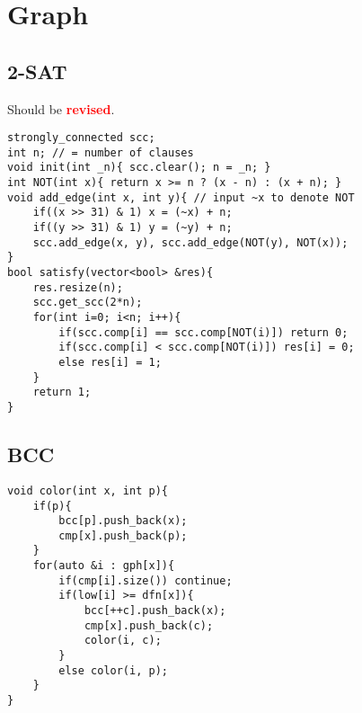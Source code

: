 \documentclass[landscape, 8pt, a4paper, oneside,  twocolumn]{extarticle}
\newcommand{\revised}{Should be \textcolor{red}{\textbf{revised}}.}
\begin{document}
\section{Graph}
\subsection {2-SAT}
\revised
\begin{verbatim}
strongly_connected scc;
int n; // = number of clauses
void init(int _n){ scc.clear(); n = _n; }  
int NOT(int x){ return x >= n ? (x - n) : (x + n); }
void add_edge(int x, int y){ // input ~x to denote NOT
	if((x >> 31) & 1) x = (~x) + n;
	if((y >> 31) & 1) y = (~y) + n;
	scc.add_edge(x, y), scc.add_edge(NOT(y), NOT(x));
}
bool satisfy(vector<bool> &res){
	res.resize(n);
	scc.get_scc(2*n);  
	for(int i=0; i<n; i++){
		if(scc.comp[i] == scc.comp[NOT(i)]) return 0;
		if(scc.comp[i] < scc.comp[NOT(i)]) res[i] = 0;
		else res[i] = 1;
	}
	return 1;
}
\end{verbatim}
\subsection {BCC}
\begin{verbatim}
void color(int x, int p){
	if(p){
		bcc[p].push_back(x);
		cmp[x].push_back(p);
	}
	for(auto &i : gph[x]){
		if(cmp[i].size()) continue;
		if(low[i] >= dfn[x]){
			bcc[++c].push_back(x);
			cmp[x].push_back(c);
			color(i, c);
		}
		else color(i, p);
	}
}
\end{verbatim}
\end{document}
